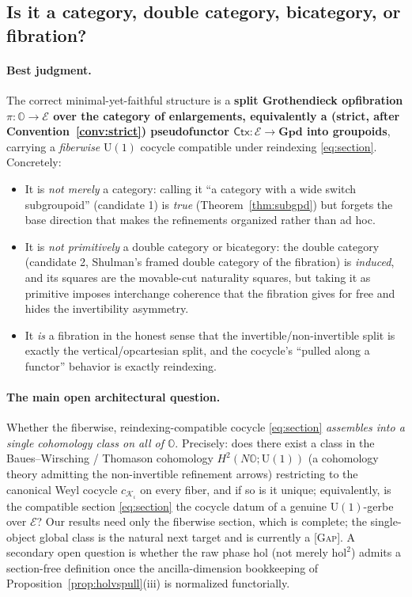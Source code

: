 \documentclass[11pt]{article}
\theoremstyle{definition}
\theoremstyle{remark}
\newcommand{\K}{\mathcal K}
\newcommand{\Ecat}{\mathcal E}
\newcommand{\Oc}{\mathbb O}
\newcommand{\Ctx}{\mathsf{Ctx}}
\newcommand{\Gpd}{\mathbf{Gpd}}
\newcommand{\U}{\mathrm{U}}
\newcommand{\hol}{\mathrm{hol}}
\newcommand{\STG}{{\normalfont\textsc{[Gap]}}}
\begin{document}
\subsection*{Is it a category, double category, bicategory, or fibration?}

\paragraph{Best judgment.}
The correct minimal-yet-faithful structure is a \textbf{split Grothendieck opfibration
$\pi:\Oc\to\Ecat$ over the category of enlargements, equivalently a (strict, after
Convention~\ref{conv:strict}) pseudofunctor $\Ctx:\Ecat\to\Gpd$ into groupoids},
carrying a \emph{fiberwise} $\U(1)$ cocycle compatible under reindexing
\eqref{eq:section}. Concretely:
\begin{itemize}[leftmargin=1.4em]
\item It is \emph{not merely} a category: calling it ``a category with a wide switch
subgroupoid'' (candidate 1) is \emph{true} (Theorem~\ref{thm:subgpd}) but forgets the
base direction that makes the refinements organized rather than ad hoc.
\item It is \emph{not primitively} a double category or bicategory: the double category
(candidate 2, Shulman's framed double category of the fibration) is \emph{induced}, and
its squares are the movable-cut naturality squares, but taking it as primitive imposes
interchange coherence that the fibration gives for free and hides the invertibility
asymmetry.
\item It \emph{is} a fibration in the honest sense that the invertible/non-invertible
split is exactly the vertical/opcartesian split, and the cocycle's ``pulled along a
functor'' behavior is exactly reindexing.
\end{itemize}

\paragraph{The main open architectural question.}
Whether the fiberwise, reindexing-compatible cocycle \eqref{eq:section} \emph{assembles
into a single cohomology class on all of $\Oc$}. Precisely: does there exist a class in
the Baues--Wirsching / Thomason cohomology $H^2(N\Oc;\U(1))$ (a cohomology theory
admitting the non-invertible refinement arrows) restricting to the canonical Weyl
cocycle $c_{\K_\iota}$ on every fiber, and if so is it unique; equivalently, is the
compatible section \eqref{eq:section} the cocycle datum of a genuine $\U(1)$-gerbe over
$\Ecat$? Our results need only the fiberwise section, which is complete; the
single-object global class is the natural next target and is currently a \STG. A
secondary open question is whether the raw phase $\hol$ (not merely $\hol^2$) admits a
section-free definition once the ancilla-dimension bookkeeping of
Proposition~\ref{prop:holvspull}(iii) is normalized functorially.
\end{document}

